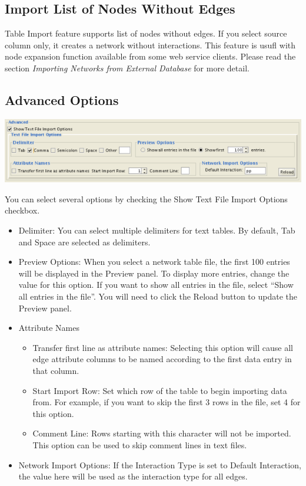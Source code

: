 \subsection{Import List of Nodes Without Edges}
 Table Import feature supports list of nodes without edges. If you select source column only, it creates a network without interactions. This feature is usufl with node expansion function available from some web service clients. Please read the section \emph{Importing Networks from External Database}
 for more detail. 

\subsection{Advanced Options}
\begin{center}
 \includegraphics[wdith=\textwidth]{images/network_import_advanced.png} 
\end{center}

 You can select several options by checking the Show Text File Import Options checkbox. 
\begin{itemize}
\item Delimiter: You can select multiple delimiters for text tables. By default, Tab and Space are selected as delimiters. 
\item Preview Options: When you select a network table file, the first 100 entries will be displayed in the Preview panel. To display more entries, change the value for this option. If you want to show all entries in the file, select ``Show all entries in the file''. You will need to click the Reload button to update the Preview panel. 
\item Attribute Names \begin{itemize}
\item Transfer first line as attribute names: Selecting this option will cause all edge attribute columns to be named according to the first data entry in that column. 
\item Start Import Row: Set which row of the table to begin importing data from. For example, if you want to skip the first 3 rows in the file, set 4 for this option. 
\item Comment Line: Rows starting with this character will not be imported. This option can be used to skip comment lines in text files. 
\end{itemize}
\item Network Import Options: If the Interaction Type is set to Default Interaction, the value here will be used as the interaction type for all edges. 
\end{itemize}
 
